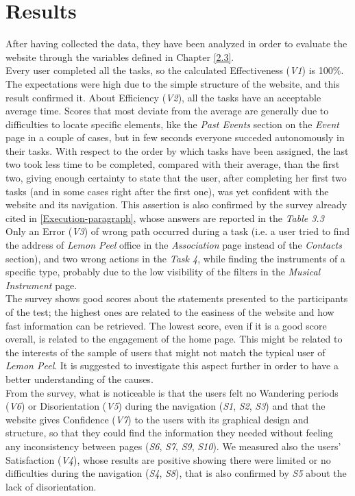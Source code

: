 \documentclass[../../UsabilityReport.tex]{subfiles}
\begin{document}
\section{Results}
	After having collected the data, they have been analyzed in order to evaluate the website through the variables defined in Chapter \ref{2.3}. \\
	
	Every user completed all the tasks, so the calculated Effectiveness (\textit{V1}) is 100\%. The expectations were high due to the simple structure of the website, and this result confirmed it. About Efficiency (\textit{V2}), all the tasks have an acceptable average time. Scores that most deviate from the average are generally due to difficulties to locate specific elements, like the \textit{Past Events} section on the \textit{Event} page in a couple of cases, but in few seconds everyone succeded autonomously in their tasks. With respect to the order by which tasks have been assigned, the last two took less time to be completed, compared with their average, than the first two, giving enough certainty to state that the user, after completing her first two tasks (and in some cases right after the first one), was yet confident with the website and its navigation. This assertion is also confirmed by the survey already cited in \ref{Execution-paragraph}, whose answers are reported in the \textit{Table 3.3}\\
	Only an Error (\textit{V3}) of wrong path occurred during a task (i.e. a user tried to find the address of \textit{Lemon Peel} office in the \textit{Association} page instead of the \textit{Contacts} section), and two wrong actions in the \textit{Task 4}, while finding the instruments of a specific type, probably due to the low visibility of the filters in the \textit{Musical Instrument} page. \\
	
	The survey shows good scores about the statements presented to the participants of the test; the highest ones are related to the easiness of the website and how fast information can be retrieved. The lowest score, even if it is a good score overall, is related to the engagement of the home page. This might be related to the interests of the sample of users that might not match the typical user of \textit{Lemon Peel}. It is suggested to investigate this aspect further in order to have a better understanding of the causes. \\
	From the survey, what is noticeable is that the users felt no Wandering periods (\textit{V6}) or Disorientation (\textit{V5}) during the navigation (\textit{S1}, \textit{S2}, \textit{S3}) and that the website gives Confidence (\textit{V7}) to the users with its graphical design and structure, so that they could find the information they needed without feeling any inconsistency between pages (\textit{S6}, \textit{S7}, \textit{S9}, \textit{S10}). We measured also the users' Satisfaction (\textit{V4}), whose results are positive showing there were limited or no difficulties during the navigation (\textit{S4}, \textit{S8}), that is also confirmed by \textit{S5} about the lack of disorientation.
	
\end{document}
